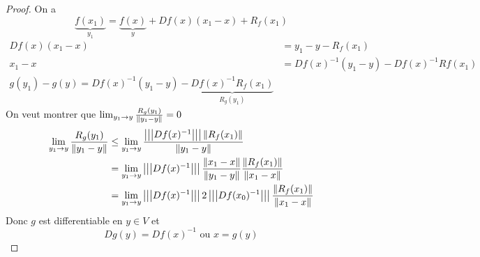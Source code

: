 \documentclass[../main.tex]{subfiles}
\begin{document}
\begin{proof}
		On a 
		\[ 
			\underbrace{f( x_1)}_{y_1} = \underbrace{f( x)}_{y}  + Df( x) ( x_1-x)  + R_f( x_1) 
		\]
		\begin{align*}
			Df( x) ( x_1-x) &= y_1 - y - R_f( x_1) \\
			x_1-x	 &= Df( x) ^{-1}( y_1-y) - Df( x)^{-1} Rf( x_1)\\
			g( y_1) - g( y) = Df( x) ^{-1}( y_1-y) - \underbrace{Df( x) ^{-1}R_f( x_1)}_{R_g( y_1) 	} 
		\end{align*}
		On veut montrer que $\lim_{y_1 \to y} \frac{R_g( y_1) }{\left\lVert y_1-y\right\rVert }=0$	
		\begin{align*}
			\lim_{y_1 \to y} \frac{R_g( y_1) }{\left\lVert y_1-y\right\rVert }&\leq \lim_{y_1 \to y} \frac{\left\vert\left\vert\left\vert Df( x) ^{-1}\right\vert\right\vert\right\vert \left\lVert R_f( x_1) \right\rVert }{\left\lVert y_1-y\right\rVert }\\
									&= \lim_{y_1 \to y} \left\vert\left\vert\left\vert Df( x) ^{-1}\right\vert\right\vert\right\vert  \frac{\left\lVert x_1-x\right\rVert }{\left\lVert y_1-y\right\rVert } \frac{\left\lVert R_f( x_1) \right\rVert }{\left\lVert x_1-x\right\rVert }\\
									&= \lim_{y_1 \to y} \left\vert\left\vert\left\vert Df( x) ^{-1}\right\vert\right\vert\right\vert 2 \left\vert\left\vert\left\vert Df( x_0) ^{-1}\right\vert\right\vert\right\vert  \frac{\left\lVert R_f( x_1) \right\rVert }{\left\lVert x_1-x\right\rVert }	
		\end{align*}
		Donc $g$ est differentiable en $y \in V$ et 
		\[ 
			Dg( y) = Df( x) ^{-1} \text{ ou } x = g( y) 
		\]
		
		

	
\end{proof}
\end{document}
